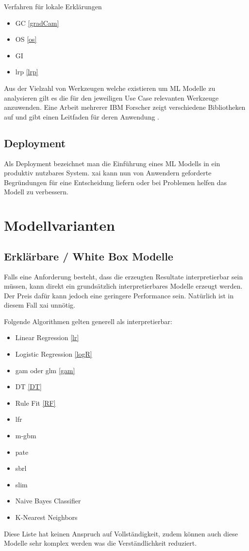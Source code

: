 \documentclass[
  12pt, %
  a4paper, %
  oneside, %
  openany, 
  numbers=noenddot, %
  BCOR=5mm, %
  parskip=half*, %
  thesis, %
]{bfhbook}
\begin{document}
Verfahren für lokale Erklärungen
\begin{itemize}
	\item \Gls{GC} \ref{gradCam}
	\item \Gls{OS} \ref{os}
	\item \Gls{GI}
	\item \Gls{lrp}  \ref{lrp}
\end{itemize}

Aus der Vielzahl von Werkzeugen welche existieren um \acrfull{ML} Modelle zu analysieren gilt es die für den jeweiligen Use Case relevanten Werkzeuge anzuwenden. Eine Arbeit mehrerer IBM Forscher zeigt verschiedene Bibliotheken auf und gibt einen Leitfaden für deren Anwendung \parencite{Arya2019}.  

\section{Deployment}
Als Deployment bezeichnet man die Einführung eines \Gls{ML} Modells in ein produktiv nutzbares System. \Gls{xai} kann nun von Anwendern geforderte Begründungen für eine Entscheidung liefern oder bei Problemen helfen das Modell zu verbessern.

\chapter{Modellvarianten}
\section{Erklärbare / White Box Modelle}

Falls eine Anforderung besteht, dass die erzeugten Resultate interpretierbar sein müssen, kann direkt ein grundsätzlich interpretierbares Modelle erzeugt werden. Der Preis dafür kann jedoch eine geringere Performance sein. Natürlich ist in diesem Fall \Gls{xai} unnötig.


Folgende Algorithmen gelten generell als interpretierbar:
\begin{itemize}
	\item Linear Regression \ref{lr}
	\item Logistic Regression \ref{logR}
	\item \acrfull{gam} oder \acrfull{glm} \ref{gam}
	\item \Gls{DT} \ref{DT}
	\item Rule Fit  \ref{RF}
	\item \acrfull{lfr}
	\item \acrfull{m-gbm}
	\item \acrfull{pate}	
	\item \acrfull{sbrl}
	\item \acrfull{slim}
	\item Naive Bayes Classifier
	\item K-Nearest Neighbors
\end{itemize}
Diese Liste hat keinen Anspruch auf Vollständigkeit, zudem können auch diese Modelle sehr komplex werden was die Verständlichkeit reduziert.
\end{document}
